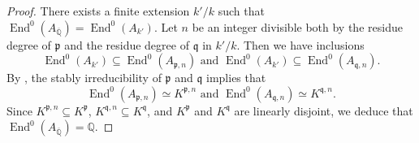 \documentclass[oneside]{amsart}
\theoremstyle{remark}
\newcommand{\Q}{\mathbb Q}
\newcommand{\Qbar}{{\overline{\mathbb Q}}}
\newcommand{\End}{\operatorname{End}}
\newcommand{\p}{\mathfrak{p}}
\newcommand{\fq}{\mathfrak{q}}
\numberwithin{equation}{section}
\begin{document}
\begin{proof}
 There exists a finite extension $k'/k$ such that $\End^0(A_\Qbar)=\End^0(A_{k'})$. Let $n$ be an integer divisible both by the residue degree of $\p$ and the residue degree of $\fq$ in $k'/k$. Then we have inclusions
 \begin{equation}\label{eq:ld1}
\End^0(A_{k'})\subseteq \End^0(A_{\p,n}) \text{ and }  \End^0(A_{k'})\subseteq \End^0(A_{\fq,n}).   
 \end{equation}\label{eq:ld2}
By \cite[Thm. 2, (c)]{Tat66}, the stably irreducibility of $\p$ and $ \fq$ implies that
\begin{equation}
  \End^0(A_{\p,n})\simeq K^{\p,n}\text{ and  }\End^0(A_{\fq,n})\simeq K^{\fq,n}.
\end{equation}
Since $K^{\p,n} \subseteq K^{\p}$, $K^{\fq,n} \subseteq K^{\fq}$, and $K^\p$ and $K^\fq$ are linearly disjoint, we deduce that $\End^0(A_{\Qbar})=\Q$.
\end{proof}
\end{document}
